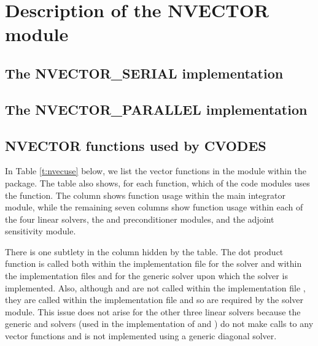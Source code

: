 \chapter{Description of the NVECTOR module}\label{s:nvector}


\section{The NVECTOR\_SERIAL implementation}\label{ss:nvec_ser}


\section{The NVECTOR\_PARALLEL implementation}\label{ss:nvec_par}


\section{NVECTOR functions used by CVODES}

In Table \ref{t:nvecuse} below, we list the vector functions in the 
{\nvector} module within the {\cvodes} package.
The table also shows, for each function, which of the code modules uses
the function. The {\cvodes} column shows function usage within the main
integrator module, while the remaining seven columns show function usage
within each of the four {\cvodes} linear solvers, the {\cvbandpre} and
{\cvbbdpre} preconditioner modules, and the {\cvodea} adjoint sensitivity
module.

There is one subtlety in the {\cvspgmr} column hidden by the table. 
The dot product function  is called both within the 
implementation file  for the {\cvspgmr} solver and within 
the implementation files  and  for the generic
{\spgmr} solver upon which the {\cvspgmr} solver is implemented. Also, although
 and  are not called within the implementation file
, they are called within the implementation file
 and so are required by the {\cvspgmr} solver module.
This issue does not arise for the other 
three {\cvodes} linear solvers because the generic {\dense} and {\band} solvers 
(used in the implementation of {\cvdense} and {\cvband}) do not make calls to 
any vector functions and {\cvdiag} is not implemented using a generic diagonal solver. 


